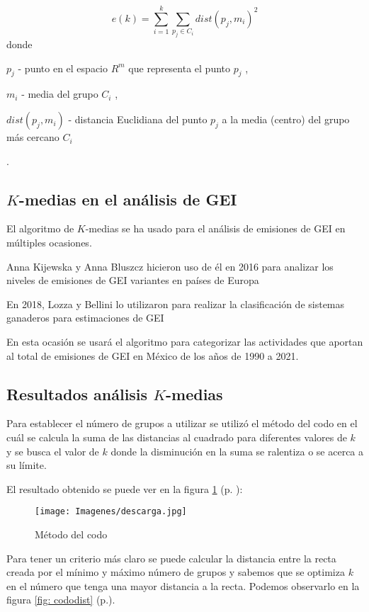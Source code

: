 \documentclass[13.6pt]{article}
\begin{document}
\[e(k) = \sum_{i=1}^{k} \sum_{p_j \in C_i}^{} dist(p_j , m_i)^2 \]
donde 

$p_j$ - punto en el espacio $R^m$ que representa el punto $p_j$ ,

$m_i$ - media del grupo $C_i$ ,

$ dist(p_j , m_i)$ - distancia Euclidiana del punto $p_j$ a la media (centro) del grupo más cercano $C_i$  

\citep{KIJEWSKA2016935}.



\subsection{$K$-medias en el análisis de GEI}
El algoritmo de $K$-medias se ha usado para el análisis de emisiones de GEI en múltiples ocasiones.

Anna Kijewska y Anna Bluszcz hicieron uso de él en 2016 para analizar los niveles de emisiones de GEI variantes en países de Europa \citep{KIJEWSKA2016935}

En 2018, Lozza y Bellini lo utilizaron para realizar la clasificación de sistemas ganaderos para estimaciones de GEI \citep{lozza2018clasificacion}

En esta ocasión se usará el algoritmo para categorizar las actividades que aportan al total de emisiones de GEI en México de los años de 1990 a 2021.


\subsection{Resultados análisis $K$-medias}
Para establecer el número de grupos a utilizar se utilizó el método del codo en el cuál se calcula la suma de las distancias al cuadrado para diferentes valores de $k$ y se busca el valor de $k$ donde la disminución en la suma se ralentiza o se acerca a su límite. 

El resultado obtenido se puede ver en la figura \ref{fig: codo} (p. \pageref{fig: codo}):

\begin{figure}
\texttt{[image: Imagenes/descarga.jpg]}
\caption{Método del codo}
\label{fig: codo}
\end{figure}

Para tener un criterio más claro se puede calcular la distancia entre la recta creada por el mínimo y máximo número de grupos y sabemos que se optimiza $k$ en el número que tenga una mayor distancia a la recta. Podemos observarlo en la figura \ref{fig: cododist} (p.\pageref{fig: cododist}).
\end{document}
